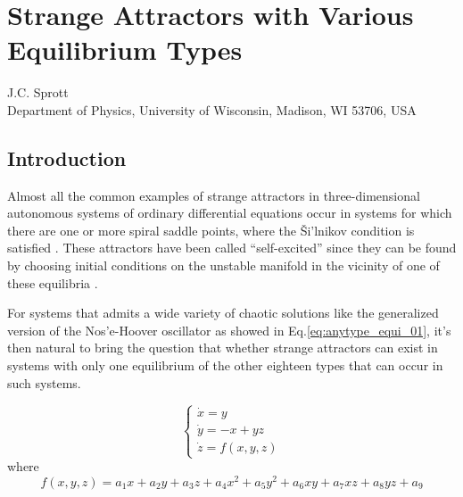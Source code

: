 \chapter{Strange Attractors with Various Equilibrium Types}
\label{chap:anytype_equi}

\begin{pauthor}
  J.C. Sprott\\
  Department of Physics, University of Wisconsin, Madison, WI 53706, USA\\
\end{pauthor}


\section{Introduction}
Almost all the common examples of strange attractors in three-dimensional autonomous
systems of ordinary differential equations occur in systems for which there
are one or more spiral saddle points, where the \v{S}i'lnikov condition is satisfied \cite{A2015Methods}.
These attractors have been called “self-excited” since they can be found by choosing initial
conditions on the unstable manifold in the vicinity of one of these equilibria \cite{Leonov2011Localization,leonov2013hidden}.

For systems that admits a wide variety of chaotic solutions like the generalized
version of the Nos'e-Hoover oscillator\cite{shuichi1991constant,PhysRevE.51.759}
as showed in Eq.\ref{eq:anytype_equi_01}, it's then natural to bring the question
that whether strange attractors can exist in systems with only one
equilibrium of the other eighteen types that can occur in such systems.

\begin{equation}
\label{eq:anytype_equi_01}
\left\{
    \begin{array}{l}
      \dot{x} = y \\
      \dot{y} = -x+yz \\
      \dot{z} = f(x,y,z) 
    \end{array}
  \right.
\end{equation}
where
\begin{equation}
\label{eq:anytype_equi_02}
f(x, y, z) = a_1x + a_2y + a_3z + a_4x^2 + a_5y^2 + a_6xy + a_7xz + a_8yz + a_9
\end{equation}

